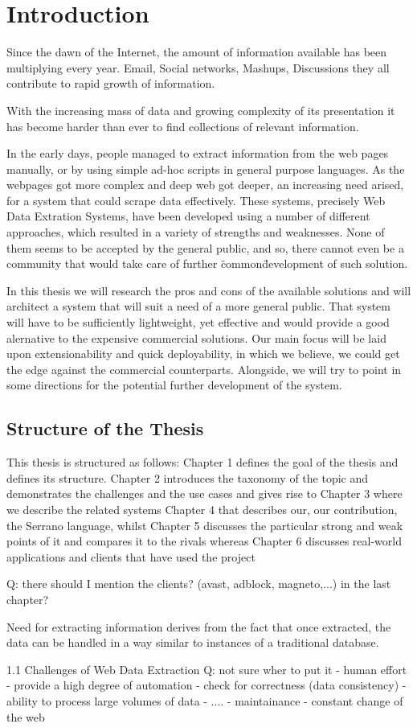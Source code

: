 \chapter{Introduction}

Since the dawn of the Internet, the amount of information available has been multiplying every year. Email, Social networks, Mashups, Discussions they all contribute to rapid growth of information.

With the increasing mass of data and growing complexity of its presentation it has become harder than ever to find collections of relevant information.

In the early days, people managed to extract information from the web pages manually,
 or by using simple ad-hoc scripts in general purpose languages.
As the webpages got more complex and deep web got deeper, 
 an increasing need arised, for a system that could scrape data effectively.
These systems, precisely Web Data Extration Systems, have been developed
 using a number of different approaches, which resulted 
in a variety of strengths and weaknesses. 
None of them seems to be accepted by the general public, and so, there cannot even be a community that would 
take care of further \"common\" development of such solution.


In this thesis we will research the pros and cons of the available solutions and will architect a system that will suit a need of a more general public.
That system will have to be sufficiently lightweight, yet effective and would provide a good alernative to the expensive commercial solutions. Our main focus will be laid upon extensionability and quick deployability, in which we believe, we could get the edge against the commercial counterparts. 
Alongside, we will try to point in some directions for the potential further development of the system.

\section{Structure of the Thesis}
This thesis is structured as follows:
Chapter 1 defines the goal of the thesis and defines its structure.
Chapter 2 introduces the taxonomy of the topic and demonstrates the challenges and the use cases and gives rise to
Chapter 3 where we describe the related systems
Chapter 4 that describes our, our contribution, the Serrano language, whilst
Chapter 5 discusses the particular strong and weak points of it and compares it to the rivals whereas
Chapter 6 discusses real-world applications and clients that have used the project 

Q: there should I mention the clients? (avast, adblock, magneto,...) in the last chapter?


Need for extracting information derives from the fact that once extracted, the data can be handled in a way similar to instances of a traditional database.

1.1 Challenges of Web Data Extraction
Q: not sure wher to put it
- human effort - provide a high degree of automation
- check for correctness (data consistency)
- ability to process large volumes of data
- ....
- maintainance - constant change of the web